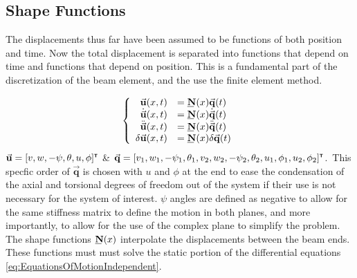 \subsection{Shape Functions} \label{Shape Functions}
The displacements thus far have been assumed to be functions of both position and time. Now the total displacement is separated into functions that depend on time and functions that depend on position. This is a fundamental part of the discretization of the beam element, and the use the finite element method.\par
\begin{equation} \label{eq:FEGoverning}
\left\{\begin{array}{rl}
\vec{\mathbf{u}}(x,t)&=\bunderline{\mathbf{N}}(x)\vec{\mathbf{q}}(t)\\
\dot{\vec{\mathbf{u}}}(x,t)&=\bunderline{\mathbf{N}}(x)\dot{\vec{\mathbf{q}}}(t)\\
\ddot{\vec{\mathbf{u}}}(x,t)&=\bunderline{\mathbf{N}}(x)\ddot{\vec{\mathbf{q}}}(t)\\
\delta\vec{\mathbf{u}}(x,t)&=\bunderline{\mathbf{N}}(x)\delta\vec{\mathbf{q}}(t)
\end{array}\right.
\end{equation}
$ \vec{\mathbf{u}}=[v,w,-\psi,\theta,u,\phi]^{\textbf{{\tiny \textsf{T}}}} $ \& $ \vec{\mathbf{q}}=[v_1,w_1,-\psi_1,\theta_1,v_2,w_2,-\psi_2,\theta_2,u_1,\phi_1,u_2,\phi_2]^{\textbf{{\tiny \textsf{T}}}} $.\ This specfic order of $ \vec{\mathbf{q}} $ is chosen with $ u $ and $ \phi $ at the end to ease the condensation of the axial and torsional degrees of freedom out of the system if their use is not necessary for the system of interest. $ \psi $ angles are defined as negative to allow for the same stiffness matrix to define the motion in both planes, and more importantly, to allow for the use of the complex plane to simplify the problem. The shape functions $ \bunderline{\mathbf{N}}(x) $ interpolate the displacements between the beam ends. These functions must must solve the static portion of the differential equations \eqref{eq:EquationsOfMotionIndependent}.

